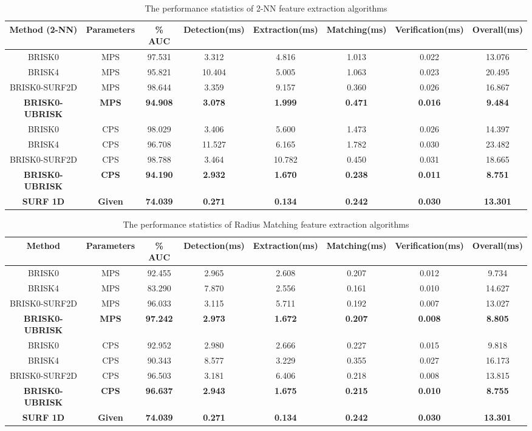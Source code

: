 \documentclass{report}
\begin{document}
\begin{table}
\centering
\caption{The performance statistics of 2-NN feature extraction algorithms}
\tiny
\begin{tabular}{|c|c|c|c|c|c|c|c|}
\hline 
\textbf{Method (2-NN)} & \textbf{Parameters} & \textbf{\% AUC} & \textbf{Detection(ms)} & \textbf{Extraction(ms)} & \textbf{Matching(ms)} & \textbf{Verification(ms)} & \textbf{Overall(ms)}\tabularnewline
\hline 
\hline 
BRISK0 & MPS & 97.531 & 3.312 & 4.816 & 1.013 & 0.022 & 13.076\tabularnewline
\hline 
BRISK4 & MPS & 95.821 & 10.404 & 5.005 & 1.063 & 0.023 & 20.495\tabularnewline
\hline 
BRISK0-SURF2D & MPS & 98.644 & 3.359 & 9.157 & 0.360 & 0.026 & 16.867\tabularnewline
\hline 
\textbf{BRISK0-UBRISK} & \textbf{MPS} & \textbf{94.908} & \textbf{3.078} & \textbf{1.999} & \textbf{0.471} & \textbf{0.016} & \textbf{9.484}\tabularnewline
\hline 
BRISK0 & CPS & 98.029 & 3.406 & 5.600 & 1.473 & 0.026 & 14.397\tabularnewline
\hline 
BRISK4 & CPS & 96.708 & 11.527 & 6.165 & 1.782 & 0.030 & 23.482\tabularnewline
\hline 
BRISK0-SURF2D & CPS & 98.788 & 3.464 & 10.782 & 0.450 & 0.031 & 18.665\tabularnewline
\hline 
\textbf{BRISK0-UBRISK} & \textbf{CPS} & \textbf{94.190} & \textbf{2.932} & \textbf{1.670} & \textbf{0.238} & \textbf{0.011} & \textbf{8.751}\tabularnewline
\hline 
\textbf{SURF 1D} & \textbf{Given} & \textbf{74.039} & \textbf{0.271} & \textbf{0.134} & \textbf{0.242} & \textbf{0.030} & \textbf{13.301}\tabularnewline
\hline 
\end{tabular}
\label{tab:mrd_times_knn}
\end{table}

\begin{table}
\centering
\caption{The performance statistics of Radius Matching feature extraction algorithms}
\tiny
\begin{tabular}{|c|c|c|c|c|c|c|c|}
\hline 
\textbf{Method} & \textbf{Parameters} & \textbf{\% AUC} & \textbf{Detection(ms)} & \textbf{Extraction(ms)} & \textbf{Matching(ms)} & \textbf{Verification(ms)} & \textbf{Overall(ms)}\tabularnewline
\hline 
\hline 
BRISK0 & MPS & 92.455 & 2.965 & 2.608 & 0.207 & 0.012 & 9.734\tabularnewline
\hline 
BRISK4 & MPS & 83.290 & 7.870 & 2.556 & 0.161 & 0.010 & 14.627\tabularnewline
\hline 
BRISK0-SURF2D & MPS & 96.033 & 3.115 & 5.711 & 0.192 & 0.007 & 13.027\tabularnewline
\hline 
\textbf{BRISK0-UBRISK} & \textbf{MPS} & \textbf{97.242} & \textbf{2.973} & \textbf{1.672} & \textbf{0.207} & \textbf{0.008} & \textbf{8.805}\tabularnewline
\hline 
BRISK0 & CPS & 92.952 & 2.980 & 2.666 & 0.227 & 0.015 & 9.818\tabularnewline
\hline 
BRISK4 & CPS & 90.343 & 8.577 & 3.229 & 0.355 & 0.027 & 16.173\tabularnewline
\hline 
BRISK0-SURF2D & CPS & 96.503 & 3.181 & 6.406 & 0.218 & 0.008 & 13.815\tabularnewline
\hline 
\textbf{BRISK0-UBRISK} & \textbf{CPS} & \textbf{96.637} & \textbf{2.943} & \textbf{1.675} & \textbf{0.215} & \textbf{0.010} & \textbf{8.755}\tabularnewline
\hline 
\textbf{SURF 1D} & \textbf{Given} & \textbf{74.039} & \textbf{0.271} & \textbf{0.134} & \textbf{0.242} & \textbf{0.030} & \textbf{13.301}\tabularnewline
\hline 
\end{tabular}
\label{tab:mrd_times_hamming}
\end{table}
\end{document}
